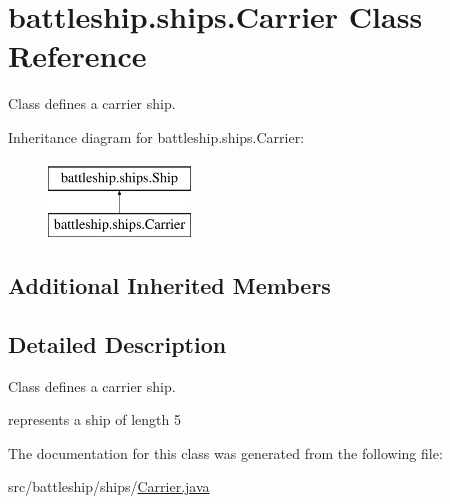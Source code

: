 \hypertarget{classbattleship_1_1ships_1_1Carrier}{}\section{battleship.\+ships.\+Carrier Class Reference}
\label{classbattleship_1_1ships_1_1Carrier}


Class defines a carrier ship.  


Inheritance diagram for battleship.\+ships.\+Carrier\+:\begin{figure}[H]
\begin{center}
\leavevmode
\includegraphics[height=2.000000cm]{classbattleship_1_1ships_1_1Carrier}
\end{center}
\end{figure}
\subsection*{Additional Inherited Members}


\subsection{Detailed Description}
Class defines a carrier ship. 

represents a ship of length 5 

The documentation for this class was generated from the following file\+:\begin{DoxyCompactItemize}
\item 
src/battleship/ships/\hyperlink{Carrier_8java}{Carrier.\+java}\end{DoxyCompactItemize}
